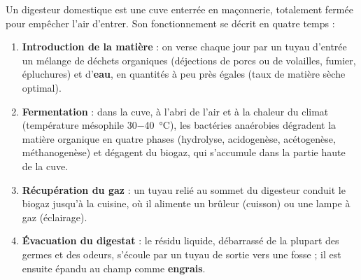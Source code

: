\documentclass[11pt]{article}
\begin{document}
Un digesteur domestique est une cuve enterrée en maçonnerie, totalement fermée pour empêcher l'air d'entrer. Son fonctionnement se décrit en quatre temps :
\begin{enumerate}
\item \textbf{Introduction de la matière} : on verse chaque jour par un tuyau d'entrée un mélange de déchets organiques (déjections de porcs ou de volailles, fumier, épluchures) et d'\textbf{eau}, en quantités à peu près égales (taux de matière sèche optimal).
\item \textbf{Fermentation} : dans la cuve, à l'abri de l'air et à la chaleur du climat (température mésophile \SI{30-40}{\celsius}), les bactéries anaérobies dégradent la matière organique en quatre phases (hydrolyse, acidogenèse, acétogenèse, méthanogenèse) et dégagent du biogaz, qui s'accumule dans la partie haute de la cuve.
\item \textbf{Récupération du gaz} : un tuyau relié au sommet du digesteur conduit le biogaz jusqu'à la cuisine, où il alimente un brûleur (cuisson) ou une lampe à gaz (éclairage).
\item \textbf{Évacuation du digestat} : le résidu liquide, débarrassé de la plupart des germes et des odeurs, s'écoule par un tuyau de sortie vers une fosse ; il est ensuite épandu au champ comme \textbf{engrais}.
\end{enumerate}
\end{document}
